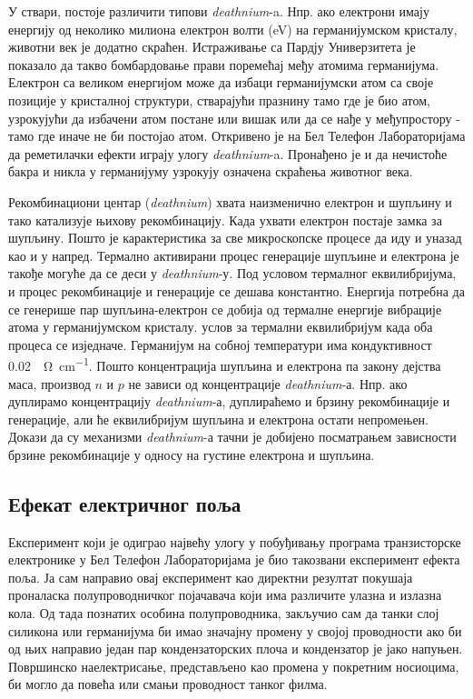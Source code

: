 \documentclass{article}
\begin{document}
У ствари, постоје различити типови \textit{deathnium}-a. Нпр. ако електрони имају енергију од неколико милиона електрон волти (eV) на германијумском кристалу, животни век је додатно скраћен. Истраживање са Пардју Универзитета је показало да такво бомбардовање прави поремећај међу атомима германијума. Електрон са великом енергијом може да избаци германијумски атом са своје позиције у кристалној структури, стварајући празнину тамо где је био атом, узрокујући да избачени атом постане или вишак или да се нађе у међупростору - тамо где иначе не би постојао атом. Откривено је на Бел Телефон Лабораторијама да реметилачки ефекти играју улогу \textit{deathnium}-a. Пронађено је и да нечистоће бакра и никла у германијуму узрокују означена скраћења животног века.

Рекомбинациони центар (\textit{deathnium}) хвата наизменично електрон и шупљину и тако катализује њихову рекомбинацију. Када ухвати електрон постаје замка за шупљину. Пошто је карактеристика за све микроскопске процесе да иду и уназад као и у напред. Термално активирани процес генерације шупљине и електрона је такође  могуће да се деси у \textit{deathnium}-у. Под условом термалног еквилибријума, и процес рекомбинације и генерације се дешава константно.  Енергија потребна да се генерише пар шупљина-електрон се добија од термалне енергије вибрације атома у германијумском кристалу. услов за термални еквилибријум када оба процеса се изједначе. Германијум на собној температури има кондуктивност \SI{0.02}{\per\ohm\per\cm}.
Пошто концентрација шупљина и електрона па закону дејства маса, производ $n$ и $p$ не зависи од концентрације \textit{deathnium}-а. Нпр. ако дуплирамо концентрацију \textit{deathnium}-а, дуплираћемо и брзину рекомбинације и генерације, али ће еквилибријум шупљина и електрона остати непромењен. Докази да су механизми \textit{deathnium}-а тачни је добијено посматрањем зависности брзине рекомбинације у односу на густине електрона и шупљина.


\subsection{Ефекат електричног поља}

Експеримент који је одиграо највећу улогу у побуђивању програма транзисторске електронике у Бел Телефон Лабораторијама је био такозвани експеримент ефекта поља. Ја сам направио овај експеримент као директни резултат покушаја проналаска полупроводничког појачавача који има различите улазна и излазна кола. Од тада познатих особина полупроводника, закључио сам да танки слој силикона или германијума би имао значајну промену у својој проводности ако би од њих направио један пар кондензаторских плоча и кондензатор је јако напуњен. Површинско наелектрисање, представљено као промена у покретним носиоцима, би могло да повећа или смањи проводност танког филма.
\end{document}
